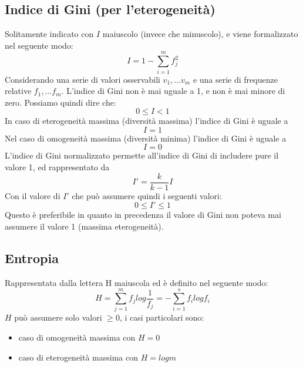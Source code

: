 \subsection{Indice di Gini (per l'eterogeneità)}
Solitamente indicato con $I$ maiuscolo (invece che minuscolo), e viene formalizzato nel seguente modo:
\begin{equation*}
I = 1 - \sum_{i=1}^m f_j^2
\end{equation*}
Considerando una serie di valori osservabili $v_1, ... v_m$ e una serie di frequenze relative $f_1, ... f_m$.
L'indice di Gini non è mai uguale a 1, e non è mai minore di zero. Possiamo quindi dire che:
\begin{equation*}
0 \leq I < 1
\end{equation*}
In caso di eterogeneità massima (diversità massima) l'indice di Gini è uguale a \begin{equation*}
I = 1
\end{equation*}
Nel caso di omogeneità massima (diversità minima) l'indice di Gini è uguale a 
\begin{equation*}
I = 0
\end{equation*}
L'indice di Gini normalizzato permette all'indice di Gini di includere pure il valore 1, ed rappresentato da
\begin{equation*}
I' = \frac{k}{k-1}I
\end{equation*}
Con il valore di $I'$ che può assumere quindi i seguenti valori:
\begin{equation*}
0 \leq I' \leq 1
\end{equation*}
Questo è preferibile in quanto in precedenza il valore di Gini non poteva mai assumere il valore 1 (massima eterogeneità).

\subsection{Entropia}
Rappresentata dalla lettera H maiuscola ed è definito nel seguente modo:
\begin{equation*}
H = \sum_{j=1}^m f_jlog\frac{1}{f_j} = - \sum_{i=1}^s f_i log f_i
\end{equation*}
$H$ può assumere solo valori $\geq 0 $, i casi particolari sono:
\begin{itemize}
\item caso di omogeneità massima con $H = 0$ %
\item caso di eterogeneità massima con $H = log m $ %
\end{itemize}


